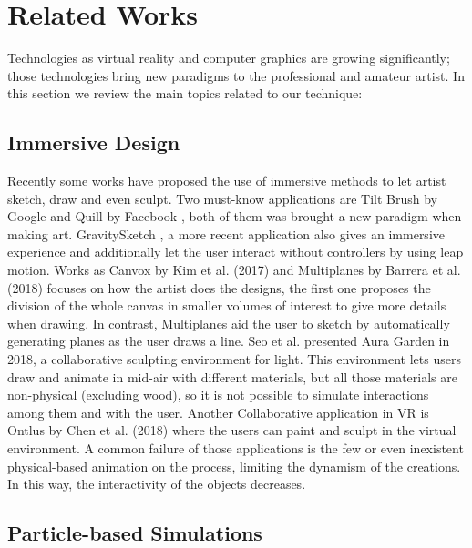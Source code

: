 \documentclass{vgtc}                          %
\begin{document}
\section{Related Works}

Technologies as virtual reality and computer graphics are growing significantly; those technologies bring new paradigms to the professional and amateur artist. In this section we review the main topics related to our technique:

\subsection{Immersive Design}
Recently some works have proposed the use of immersive methods to let artist sketch, draw and even sculpt. Two must-know applications are Tilt Brush by Google \cite{TiltBrush} and Quill by Facebook \cite{Quill}, both of them was brought a new paradigm when making art. GravitySketch \cite{GravitySketch}, a more recent application also gives an immersive experience and additionally let the user interact without controllers by using leap motion. Works as Canvox by Kim et al. (2017) \cite{Kim2017} and Multiplanes by Barrera et al. (2018) \cite{BarreraMachuca2017} focuses on how the artist does the designs, the first one proposes the division of the whole canvas in smaller volumes of interest to give more details when drawing. In contrast, Multiplanes aid the user to sketch by automatically generating planes as the user draws a line. Seo et al. \cite{Seo2018} presented Aura Garden in 2018, a collaborative sculpting environment for light. This environment lets users draw and animate in mid-air with different materials, but all those materials are non-physical (excluding wood), so it is not possible to simulate interactions among them and with the user. Another Collaborative application in VR is Ontlus by Chen et al. (2018) \cite{Chen2018} where the users can paint and sculpt in the virtual environment. A common failure of those applications is the few or even inexistent physical-based animation on the process, limiting the dynamism of the creations. In this way, the interactivity of the objects decreases.

\subsection{Particle-based Simulations}
 
\end{document}
